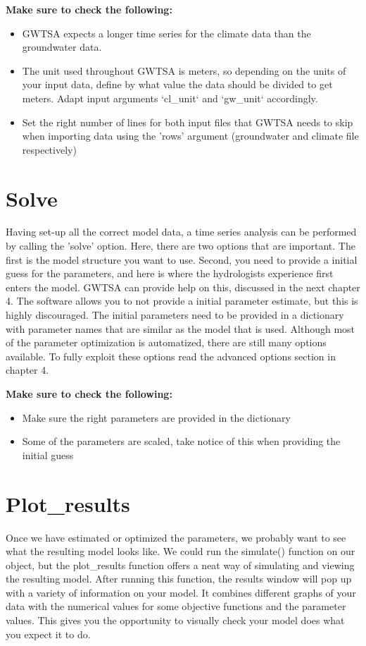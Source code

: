 \textbf{Make sure to check the following:}
\begin{itemize}
\item{GWTSA expects a longer time series for the climate data than the groundwater data.}	
\item{The unit used throughout GWTSA is meters, so depending on the units of your input data, define by what value the data should be divided to get meters. Adapt input arguments `cl\_unit` and `gw\_unit` accordingly.}
\item{Set the right number of lines for both input files that GWTSA needs to skip when importing data using the 'rows' argument (groundwater and climate file respectively)}
\end{itemize}
	
\section{Solve}
Having set-up all the correct model data, a time series analysis can be performed by calling the 'solve' option. Here, there are two options that are important. The first is the model structure you want to use. Second, you need to provide a initial guess for the parameters, and here is where the hydrologists experience first enters the model. GWTSA can provide help on this, discussed in the next chapter 4. The software allows you to not provide a initial parameter estimate, but this is highly discouraged. The initial parameters need to be provided in a dictionary with parameter names that are similar as the model that is used. Although most of the parameter optimization is automatized, there are still many options available. To fully exploit these options read the advanced options section in chapter 4.

\textbf{Make sure to check the following:}
\begin{itemize}
	\item{Make sure the right parameters are provided in the dictionary}
	\item{Some of the parameters are scaled, take notice of this when providing the initial guess}
\end{itemize}

\section{Plot\_results}
Once we have estimated or optimized the parameters, we probably want to see what the resulting model looks like. We could run the simulate() function on our object, but the plot\_results function offers a neat way of simulating and viewing the resulting model. After running this function, the results window will pop up with a variety of information on your model. It combines different graphs of your data with the numerical values for some objective functions and the parameter values. This gives you the opportunity to visually check your model does what you expect it to do. 

